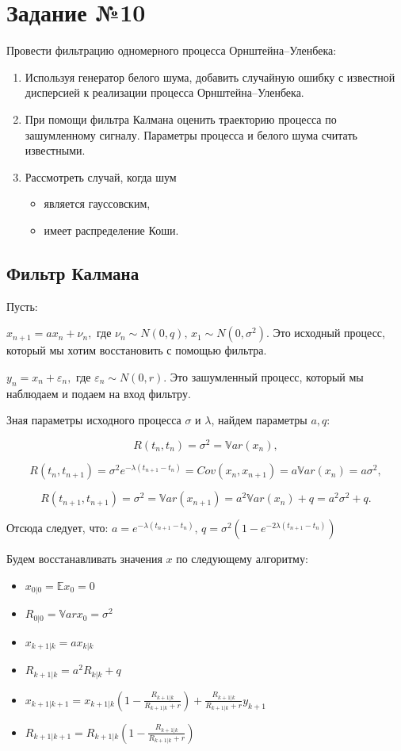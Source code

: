 \documentclass[a4paper, 11pt]{article}
\theoremstyle{def}
\theoremstyle{th}
\theoremstyle{rem}
\begin{document}
\section{Задание №10}

Провести фильтрацию одномерного процесса Орнштейна--Уленбека:
\begin{enumerate}
        \item Используя генератор белого шума, добавить случайную ошибку с известной дисперсией к реализации процесса Орнштейна--Уленбека.
        \item При помощи фильтра Калмана оценить траекторию процесса по зашумленному сигналу. Параметры процесса и белого шума считать известными.
        \item Рассмотреть случай, когда шум 
        \begin{itemize}
                \item является гауссовским,
                \item имеет распределение Коши.
        \end{itemize}
\end{enumerate}

\subsection{Фильтр Калмана}
Пусть:

$x_{n+1} = a x_n + \nu_n,$ где $\nu_n \sim N(0, q), \, x_1 \sim N(0, \sigma^2)$. Это исходный процесс, который мы хотим восстановить с помощью фильтра.

$y_n = x_n + \varepsilon_n,$ где $\varepsilon_n \sim N(0, r).$ Это зашумленный процесс, который мы наблюдаем и подаем на вход фильтру.

Зная параметры исходного процесса $\sigma$ и $\lambda$, найдем параметры $a, q$:

$$R(t_n, t_n) = \sigma^2 = \mathbb{V}ar(x_n),$$

$$R(t_n, t_{n+1}) = \sigma^2 e^{-\lambda(t_{n+1}-t_n)} = Cov(x_n, x_{n+1}) = a \mathbb{V}ar(x_n) = a \sigma^2,$$

$$R(t_{n+1}, t_{n+1}) = \sigma^2 = \mathbb{V}ar(x_{n+1}) = a^2 \mathbb{V}ar(x_n) + q = a^2 \sigma^2 + q.$$

Отсюда следует, что: $a = e^{-\lambda(t_{n+1}-t_n)}, \, q = \sigma^2(1 - e^{-2\lambda(t_{n+1}-t_n)})$

Будем восстанавливать значения $x$ по следующему алгоритму:
\begin{itemize}
    \item $x_{0|0} = \mathbb{E}x_0 = 0$
    \item $R_{0|0} = \mathbb{V}ar x_0 = \sigma^2$
    \item $x_{k+1|k} = a x_{k|k}$
    \item $R_{k+1|k} = a^2 R_{k|k} + q$
    \item $x_{k+1|k+1} = x_{k+1|k}\left(1 - \frac{R_{k+1|k}}{R_{k+1|k} + r}\right) + \frac{R_{k+1|k}}{R_{k+1|k} + r}y_{k+1}$
    \item $R_{k+1|k+1} = R_{k+1|k}\left(1 - \frac{R_{k+1|k}}{R_{k+1|k} + r}\right)$
\end{itemize}
\end{document}
